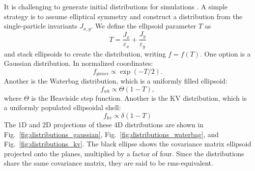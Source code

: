 It is challenging to generate initial distributions for simulations \cite{Lund2009}. A simple strategy is to assume elliptical symmetry and construct a distribution from the single-particle invariants $J_{x,y}$. We define the ellipsoid parameter $T$ as 
%
\begin{equation}
    T = \frac{J_x}{\varepsilon_x} + \frac{J_y}{\varepsilon_y}
\end{equation}
%
and stack ellipsoids to create the distribution, writing $f = f(T)$. One option is a Gaussian distribution. In normalized coordinates:
%
\begin{equation}
    f_{gauss} \propto \exp(-T/2).
\end{equation}
%
Another is the Waterbag distribution, which is a uniformly filled ellipsoid:
%
\begin{equation}
    f_{wb} \propto \Theta(1 - T),
\end{equation}
%
where $\Theta$ is the Heaviside step function. Another is the KV distribution, which is a uniformly populated ellipsoidal shell:
%
\begin{equation}
    f_{kv} \propto \delta(1 - T)
\end{equation}
%
The 1D and 2D projections of these 4D distributions are shown in Fig.~\ref{fig:distributions_gaussian}, Fig.~\ref{fig:distributions_waterbag}, and Fig.~\ref{fig:distributions_kv}. The black ellipse shows the covariance matrix ellipsoid projected onto the planes, multiplied by a factor of four. Since the distributions share the same covariance matrix, they are said to be rms-equivalent.
%
